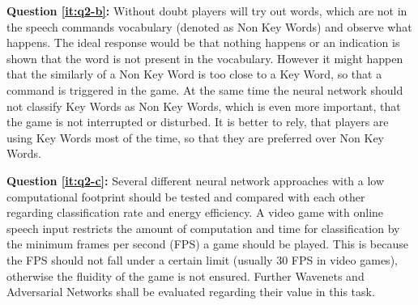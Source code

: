 \textbf{Question \ref{it:q2-b}:} Without doubt players will try out words, which are not in the speech commands vocabulary (denoted as Non Key Words) and observe what happens.
The ideal response would be that nothing happens or an indication is shown that the word is not present in the vocabulary. 
However it might happen that the similarly of a Non Key Word is too close to a Key Word, so that a command is triggered in the game. 
At the same time the neural network should not classify Key Words as Non Key Words, which is even more important, that the game is not interrupted or disturbed.
It is better to rely, that players are using Key Words most of the time, so that they are preferred over Non Key Words.

\textbf{Question \ref{it:q2-c}:}
Several different neural network approaches with a low computational footprint should be tested and compared with each other regarding classification rate and energy efficiency. 
A video game with online speech input restricts the amount of computation and time for classification by the minimum frames per second (FPS) a game should be played.
This is because the FPS should not fall under a certain limit (usually 30 FPS in video games), otherwise the fluidity of the game is not ensured.
Further Wavenets and Adversarial Networks shall be evaluated regarding their value in this task.
